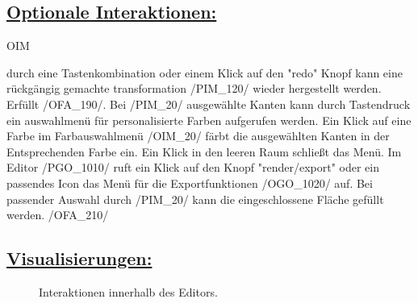 %


\subsection*{\underline{Optionale Interaktionen:}}

\begin{ids}{\gls{OIM}}

	\id[10] durch eine Tastenkombination oder einem Klick auf den "redo" Knopf kann eine rückgängig gemachte transformation /PIM\_120/ wieder hergestellt werden. Erfüllt /OFA\_190/.
	\id[20] Bei /PIM\_20/ ausgewählte Kanten kann durch Tastendruck ein auswahlmenü für personalisierte Farben aufgerufen werden.
	\id[30] Ein Klick auf eine Farbe im Farbauswahlmenü /OIM\_20/ färbt die ausgewählten Kanten in der Entsprechenden Farbe ein. Ein Klick in den leeren Raum schließt das Menü.
	\id[40] Im Editor /PGO\_1010/ ruft ein Klick auf den Knopf "render/export" oder ein passendes Icon das Menü für die Exportfunktionen /OGO\_1020/ auf.
	\id[50] Bei passender Auswahl durch /PIM\_20/ kann die eingeschlossene Fläche gefüllt werden. /OFA\_210/ 

\end{ids}

\clearpage

\subsection*{\underline{Visualisierungen:}}

	\begin{figure}[h]
		\centering
	 	
	 	\caption{Interaktionen innerhalb des Editors.}
		\label{fig:inGame}
	\end{figure}
